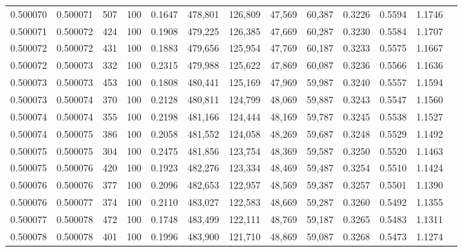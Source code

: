 \begin{tabular}{rrrrrrrrrrrrr}
0.500070 & 0.500071 &   507 & 100 &                                     0.1647 & 478,801 & 126,809 &  47,569 &  60,387 & 0.3226 & 0.5594 & 1.1746 \\
0.500071 & 0.500072 &   424 & 100 &                                     0.1908 & 479,225 & 126,385 &  47,669 &  60,287 & 0.3230 & 0.5584 & 1.1707 \\
0.500072 & 0.500072 &   431 & 100 &                                     0.1883 & 479,656 & 125,954 &  47,769 &  60,187 & 0.3233 & 0.5575 & 1.1667 \\
0.500072 & 0.500073 &   332 & 100 &                                     0.2315 & 479,988 & 125,622 &  47,869 &  60,087 & 0.3236 & 0.5566 & 1.1636 \\
0.500073 & 0.500073 &   453 & 100 &                                     0.1808 & 480,441 & 125,169 &  47,969 &  59,987 & 0.3240 & 0.5557 & 1.1594 \\
0.500073 & 0.500074 &   370 & 100 &                                     0.2128 & 480,811 & 124,799 &  48,069 &  59,887 & 0.3243 & 0.5547 & 1.1560 \\
0.500074 & 0.500074 &   355 & 100 &                                     0.2198 & 481,166 & 124,444 &  48,169 &  59,787 & 0.3245 & 0.5538 & 1.1527 \\
0.500074 & 0.500075 &   386 & 100 &                                     0.2058 & 481,552 & 124,058 &  48,269 &  59,687 & 0.3248 & 0.5529 & 1.1492 \\
0.500075 & 0.500075 &   304 & 100 &                                     0.2475 & 481,856 & 123,754 &  48,369 &  59,587 & 0.3250 & 0.5520 & 1.1463 \\
0.500075 & 0.500076 &   420 & 100 &                                     0.1923 & 482,276 & 123,334 &  48,469 &  59,487 & 0.3254 & 0.5510 & 1.1424 \\
0.500076 & 0.500076 &   377 & 100 &                                     0.2096 & 482,653 & 122,957 &  48,569 &  59,387 & 0.3257 & 0.5501 & 1.1390 \\
0.500076 & 0.500077 &   374 & 100 &                                     0.2110 & 483,027 & 122,583 &  48,669 &  59,287 & 0.3260 & 0.5492 & 1.1355 \\
0.500077 & 0.500078 &   472 & 100 &                                     0.1748 & 483,499 & 122,111 &  48,769 &  59,187 & 0.3265 & 0.5483 & 1.1311 \\
0.500078 & 0.500078 &   401 & 100 &                                     0.1996 & 483,900 & 121,710 &  48,869 &  59,087 & 0.3268 & 0.5473 & 1.1274 \\

\end{tabular}
